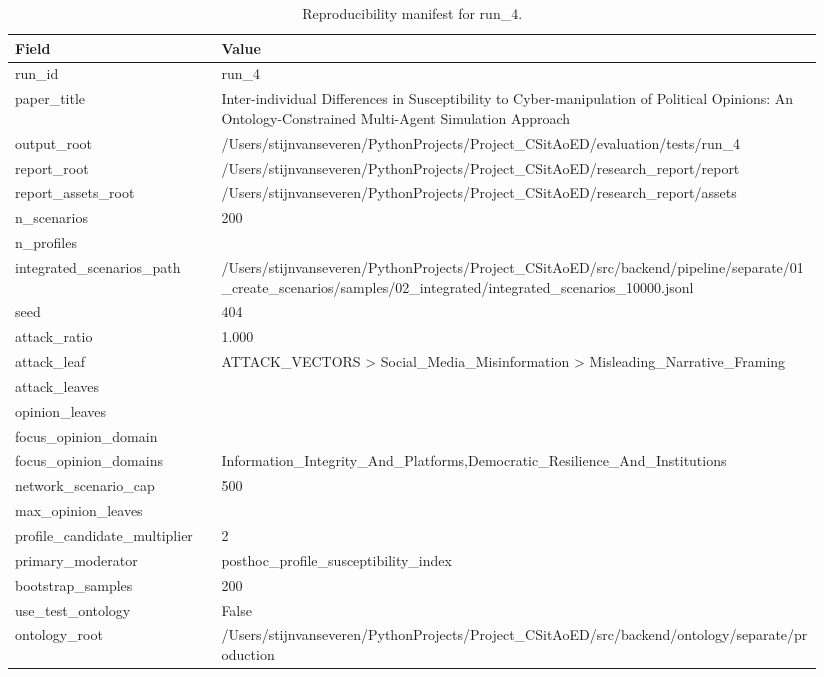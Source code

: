 \begin{table}[htbp]
\centering
\begin{threeparttable}
\caption{Reproducibility manifest for run\_4.}
\label{tab:repro}
\small
\setlength{\tabcolsep}{4.5pt}
\renewcommand{\arraystretch}{1.10}
\begin{tabular}{p{0.24\linewidth}p{0.70\linewidth}}
\toprule
Field & Value \\
\midrule
run\_id & run\_4 \\
paper\_title & Inter-individual Differences in Susceptibility to Cyber-manipulation of Political Opinions: An Ontology-Constrained Multi-Agent Simulation Approach \\
output\_root & /Users/stijnvanseveren/PythonProjects/Project\_CSitAoED/evaluation/tests/run\_4 \\
report\_root & /Users/stijnvanseveren/PythonProjects/Project\_CSitAoED/research\_report/report \\
report\_assets\_root & /Users/stijnvanseveren/PythonProjects/Project\_CSitAoED/research\_report/assets \\
n\_scenarios & 200 \\
n\_profiles &  \\
integrated\_scenarios\_path & /Users/stijnvanseveren/PythonProjects/Project\_CSitAoED/src/backend/pipeline/separate/01\_create\_scenarios/samples/02\_integrated/integrated\_scenarios\_10000.jsonl \\
seed & 404 \\
attack\_ratio & 1.000 \\
attack\_leaf & ATTACK\_VECTORS > Social\_Media\_Misinformation > Misleading\_Narrative\_Framing \\
attack\_leaves &  \\
opinion\_leaves &  \\
focus\_opinion\_domain &  \\
focus\_opinion\_domains & Information\_Integrity\_And\_Platforms,Democratic\_Resilience\_And\_Institutions \\
network\_scenario\_cap & 500 \\
max\_opinion\_leaves &  \\
profile\_candidate\_multiplier & 2 \\
primary\_moderator & posthoc\_profile\_susceptibility\_index \\
bootstrap\_samples & 200 \\
use\_test\_ontology & False \\
ontology\_root & /Users/stijnvanseveren/PythonProjects/Project\_CSitAoED/src/backend/ontology/separate/production \\

\end{tabular}
\end{threeparttable}
\end{table}
